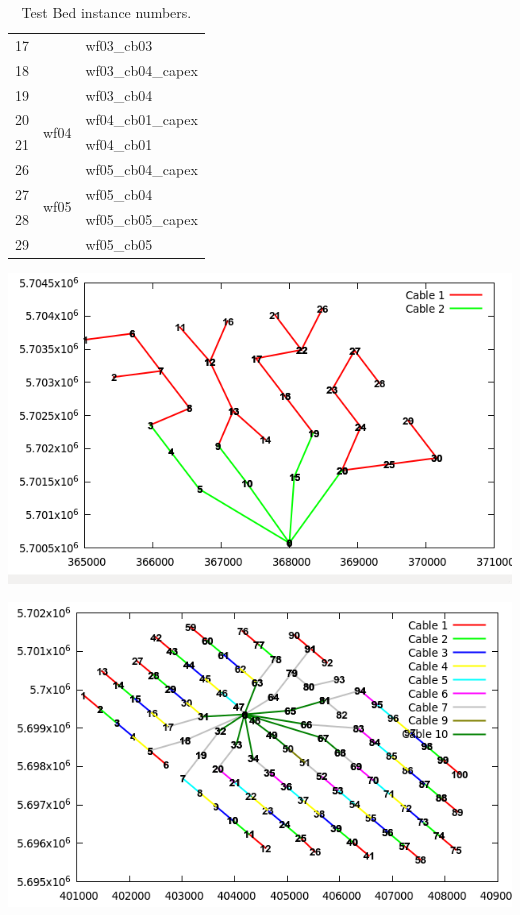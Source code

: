 \begin{table}[!htbp]
\begin{tabular}{lcl}
17     &                               & wf03\_cb03        \\
18     &                               & wf03\_cb04\_capex \\
19     &                               & wf03\_cb04        \\ \hline
20     & \multirow{2}{*}{wf04}         & wf04\_cb01\_capex \\
21     &                               & wf04\_cb01        \\ \hline
26     & \multirow{4}{*}{wf05}         & wf05\_cb04\_capex \\
27     &                               & wf05\_cb04        \\
28     &                               & wf05\_cb05\_capex \\
29     &                               & wf05\_cb05        \\ \hline
\end{tabular}
\caption {Test Bed instance numbers.}
\end{table}

\begin{minipage}{7cm} 
	\centering
	\includegraphics[scale=0.3]{Graphics/data07.png} \\
	\label{img:ex1}
	\end{minipage}
	\begin{minipage}{7cm} 
	\centering
	\includegraphics[scale=0.3]{Graphics/data29.png} \\
	\label{img:ex2}
	\end{minipage}

\newpage
